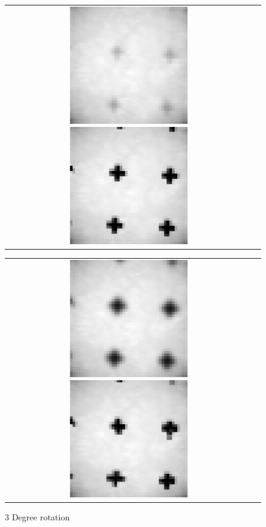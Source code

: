 \documentclass[iop]{emulateapj}
\begin{document}
\begin{figure}
        \begin{tabular}{cc}
            \includegraphics[width=0.5\textwidth]{rot_3_1}
            \includegraphics[width=0.5\textwidth]{rot_3_2}
        \end{tabular}
        \begin{tabular}{cc}
            \includegraphics[width=0.5\textwidth]{rot_3_3}
            \includegraphics[width=0.5\textwidth]{rot_3_4}
        \end{tabular}
        \caption{3 Degree rotation}
\end{figure}
\end{document}
